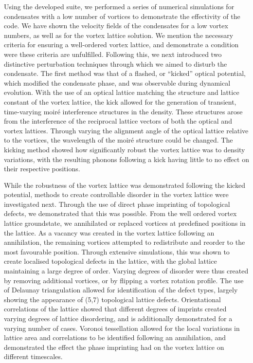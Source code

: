 Using the developed suite, we performed a series of numerical simulations for condensates with a low number of vortices to demonstrate the effectivity of the code. We have shown the velocity fields of the condensates for a low vortex numbers, as well as for the vortex lattice solution. We mention the necessary criteria for ensuring a well-ordered vortex lattice, and demonstrate a condition were these criteria are unfulfilled. Following this, we next introduced two distinctive perturbation techniques through which we aimed to disturb the condensate. The first method was that of a flashed, or ``kicked'' optical potential, which modified the condensate phase, and was observable during dynamical evolution. With the use of an optical lattice matching the structure and lattice constant of the vortex lattice, the kick allowed for the generation of transient, time-varying moir\'e interference structures in the density. These structures arose from the interference of the reciprocal lattice vectors of both the optical and vortex lattices. Through varying the alignment angle of the optical lattice relative to the vortices, the wavelength of the moir\'e structure could be changed. The kicking method showed how significantly robust the vortex lattice was to density variations, with the resulting phonons following a kick having little to no effect on their respective positions.

While the robustness of the vortex lattice was demonstrated following the kicked potential, methods to create controllable disorder in the vortex lattice were investigated next. Through the use of direct phase imprinting of topological defects, we demonstrated that this was possible. From the well ordered vortex lattice groundstate, we annihilated or replaced vortices at predefined positions in the lattice. As a vacancy was created in the vortex lattice following an annihilation, the remaining vortices attempted to redistribute and reorder to the most favourable position. Through extensive simulations, this was shown to create localised topological defects in the lattice, with the global lattice maintaining a large degree of order. Varying degrees of disorder were thus created by removing additional vortices, or by flipping a vortex rotation profile. The use of Delaunay triangulation allowed for identification of the defect types, largely showing the appearance of (5,7) topological lattice defects. Orientational correlations of the lattice showed that different degrees of imprints created varying degrees of lattice disordering, and is additionally demonstrated for a varying number of cases. Voronoi tessellation allowed for the local variations in lattice area and correlations to be identified following an annihilation, and demonstrated the effect the phase imprinting had on the vortex lattice on different timescales.

